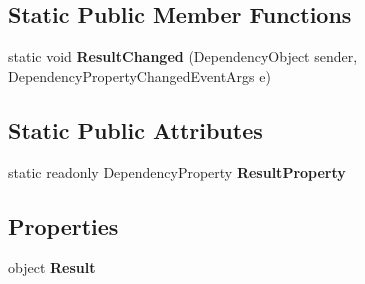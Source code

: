 \subsection*{Static Public Member Functions}
\begin{DoxyCompactItemize}
\item 
\hypertarget{class_cloud_api_public_1_1_event_message_receiver_1_1_binding_evaluator_aa6d5ec8fb84eaf32b39dc8fb1644434c}{static void {\bfseries Result\-Changed} (Dependency\-Object sender, Dependency\-Property\-Changed\-Event\-Args e)}\label{class_cloud_api_public_1_1_event_message_receiver_1_1_binding_evaluator_aa6d5ec8fb84eaf32b39dc8fb1644434c}

\end{DoxyCompactItemize}
\subsection*{Static Public Attributes}
\begin{DoxyCompactItemize}
\item 
static readonly Dependency\-Property {\bfseries Result\-Property}
\end{DoxyCompactItemize}
\subsection*{Properties}
\begin{DoxyCompactItemize}
\item 
\hypertarget{class_cloud_api_public_1_1_event_message_receiver_1_1_binding_evaluator_a4cc2aee7740ef07eb1d4e4ba03356a80}{object {\bfseries Result}}\label{class_cloud_api_public_1_1_event_message_receiver_1_1_binding_evaluator_a4cc2aee7740ef07eb1d4e4ba03356a80}

\end{DoxyCompactItemize}


